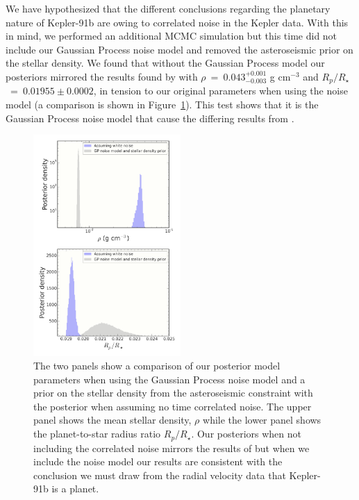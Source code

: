 \documentclass[apjl]{emulateapj}
\begin{document}
We have hypothesized that the different conclusions regarding the planetary nature of Kepler-91b are owing to correlated noise in the Kepler data. With this in mind, we performed an additional MCMC simulation but this time did not include our Gaussian Process noise model and removed the asteroseismic prior on the stellar density. We found that without the Gaussian Process model our posteriors mirrored the results found by \citet{sliski14} with $\rho$~=~$0.043^{+0.001}_{-0.003}$ g cm$^{-3}$ and $R_p/R_\star$~=~$0.01955\pm 0.0002$, in tension to our original parameters when using the noise model (a comparison is shown in Figure~\ref{fig:comp_noGP}). This test shows that it is the Gaussian Process noise model that cause the differing results from \citet{sliski14}. 

 \begin{figure}
\includegraphics[width=0.50\textwidth]{comp_noGP.pdf}
\caption{The two panels show a comparison of our posterior model parameters when using the Gaussian Process noise model and a prior on the stellar density from the asteroseismic constraint with the posterior when assuming no time correlated noise. The upper panel shows the mean stellar density, $\rho$ while the lower panel shows the planet-to-star radius ratio $R_p/R_\star$. Our posteriors when not including the correlated noise mirrors the results of \citet{sliski14} but when we include the noise model our results are consistent with the conclusion we must draw from the radial velocity data that Kepler-91b is a planet.}
\label{fig:comp_noGP}
\end{figure}
\end{document}
